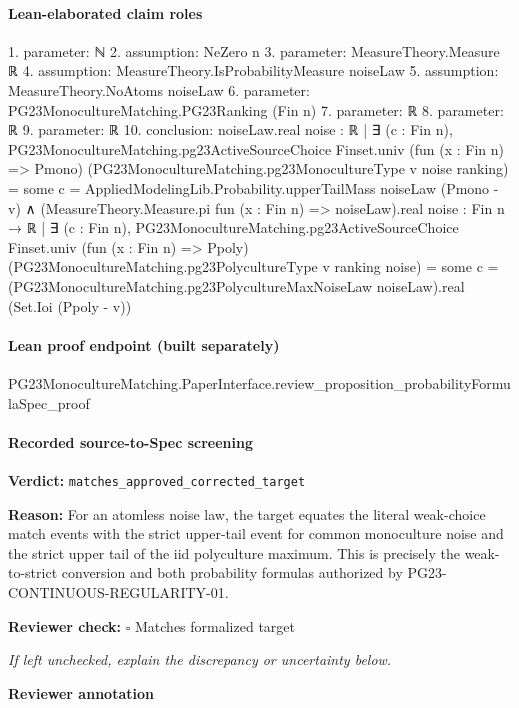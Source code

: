 \documentclass[10pt]{article}
\newcommand{\reviewerbox}{%
  \par\noindent\fbox{\parbox{0.96\linewidth}{\rule{0pt}{0.38in}}}\par
}
\newcommand{\reviewmatch}[1]{%
  \par\noindent\textbf{Reviewer check:} $\square$\; #1\par
  \noindent\emph{If left unchecked, explain the discrepancy or uncertainty below.}\par
}
\begin{document}
\paragraph{Lean-elaborated claim roles}\begin{ReviewVerbatim}
1. parameter: ℕ
2. assumption: NeZero n
3. parameter: MeasureTheory.Measure ℝ
4. assumption: MeasureTheory.IsProbabilityMeasure noiseLaw
5. assumption: MeasureTheory.NoAtoms noiseLaw
6. parameter: PG23MonocultureMatching.PG23Ranking (Fin n)
7. parameter: ℝ
8. parameter: ℝ
9. parameter: ℝ
10. conclusion: noiseLaw.real
      {noise : ℝ |
        ∃ (c : Fin n),
          PG23MonocultureMatching.pg23ActiveSourceChoice Finset.univ (fun (x : Fin n) => Pmono)
              (PG23MonocultureMatching.pg23MonocultureType v noise ranking) =
            some c} =
    AppliedModelingLib.Probability.upperTailMass noiseLaw (Pmono - v) ∧
  (MeasureTheory.Measure.pi fun (x : Fin n) => noiseLaw).real
      {noise : Fin n → ℝ |
        ∃ (c : Fin n),
          PG23MonocultureMatching.pg23ActiveSourceChoice Finset.univ (fun (x : Fin n) => Ppoly)
              (PG23MonocultureMatching.pg23PolycultureType v ranking noise) =
            some c} =
    (PG23MonocultureMatching.pg23PolycultureMaxNoiseLaw noiseLaw).real (Set.Ioi (Ppoly - v))
\end{ReviewVerbatim}

\paragraph{Lean proof endpoint (built separately)}\begin{ReviewVerbatim}
PG23MonocultureMatching.PaperInterface.review_proposition_probabilityFormulaSpec_proof
\end{ReviewVerbatim}

\paragraph{Recorded source-to-Spec screening}
\textbf{Verdict:} \texttt{matches\_approved\_corrected\_target}
\\
{\raggedright
\textbf{Reason:} For an atomless noise law, the target equates the literal weak-\allowbreak{}choice match events with the strict upper-\allowbreak{}tail event for common monoculture noise and the strict upper tail of the iid polyculture maximum.\allowbreak{} This is precisely the weak-\allowbreak{}to-\allowbreak{}strict conversion and both probability formulas authorized by PG23-\allowbreak{}CONTINUOUS-\allowbreak{}REGULARITY-\allowbreak{}01.\allowbreak{}
\par}
\reviewmatch{Matches formalized target}
\noindent\textbf{Reviewer annotation}\par
\reviewerbox
\clearpage
\hypertarget{source-claim-33a990cf61364541}{}
\end{document}
